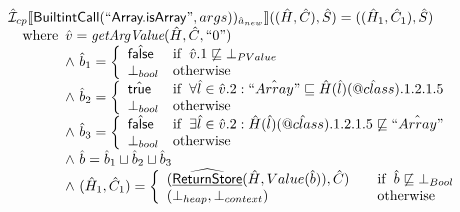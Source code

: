 \[\begin{array}{l}
\aI _{cp}\lbr \SF{BuiltintCall}(``\SF{Array.isArray}",args))_{\hat{a}_{new}}\rbr((\hat{H},\hat{C}), \hat{S})
  = ((\hat{H}_1, \hat{C}_1), \hat{S})\\
\quad\wherec{
  \hat{v} = \hf{getArgValue}(\hat{H}, \hat{C}, ``0")\\
  \land\ \hat{b}_1 = \left\{\begin{array}{ll}
      \afalse & \ifc{\hat{v}.1 \not\sqsubseteq \bot_{PValue}}\\
      \bot_{bool}& \owc
    \end{array}\right.\\
  \land\ \hat{b}_2 = \left\{\begin{array}{ll}
      \atrue & \ifc{\forall \hat{l} \in \hat{v}.2 : \hat{``Array"} \sqsubseteq \hat{H}(\hat{l})(\avarprop{class}).1.2.1.5}\\
      \bot_{bool}& \owc
    \end{array}\right.\\
  \land\ \hat{b}_3 = \left\{\begin{array}{ll}
      \afalse & \ifc{\exists\hat{l} \in \hat{v}.2 : \hat{H}(\hat{l})(\avarprop{class}).1.2.1.5 \not\sqsubseteq \hat{``Array"} }\\
      \bot_{bool}& \owc
    \end{array}\right.\\
  \land\ \hat{b} = \hat{b}_1 \sqcup \hat{b}_2 \sqcup \hat{b}_3\\
  \land\ (\hat{H}_1, \hat{C}_1) = 
    \left\{\begin{array}{l@{\quad\quad}l}
      (\ahf{ReturnStore}(\hat{H}, Value(\hat{b})), \hat{C})
      & \ifc{\hat{b} \not\sqsubseteq \bot_{Bool}}\\
      (\bot_{heap}, \bot_{context}) & \owc \\
    \end{array}\right.\\
  }\\	
\\\\


\end{array}
\]


